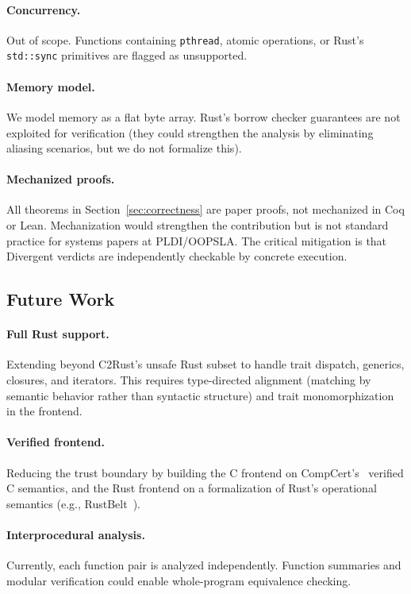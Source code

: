 \documentclass[11pt]{article}
\begin{document}
\paragraph{Concurrency.}
Out of scope. Functions containing \texttt{pthread}, atomic operations, or Rust's \texttt{std::sync} primitives are flagged as unsupported.

\paragraph{Memory model.}
We model memory as a flat byte array. Rust's borrow checker guarantees are not exploited for verification (they could strengthen the analysis by eliminating aliasing scenarios, but we do not formalize this).

\paragraph{Mechanized proofs.}
All theorems in Section~\ref{sec:correctness} are paper proofs, not mechanized in Coq or Lean. Mechanization would strengthen the contribution but is not standard practice for systems papers at PLDI/OOPSLA. The critical mitigation is that Divergent verdicts are independently checkable by concrete execution.

\subsection{Future Work}
\label{sec:future}

\paragraph{Full Rust support.}
Extending beyond C2Rust's unsafe Rust subset to handle trait dispatch, generics, closures, and iterators. This requires type-directed alignment (matching by semantic behavior rather than syntactic structure) and trait monomorphization in the frontend.

\paragraph{Verified frontend.}
Reducing the trust boundary by building the C frontend on CompCert's~\cite{leroy2009} verified C semantics, and the Rust frontend on a formalization of Rust's operational semantics (e.g., RustBelt~\cite{jung2017}).

\paragraph{Interprocedural analysis.}
Currently, each function pair is analyzed independently. Function summaries and modular verification could enable whole-program equivalence checking.
\end{document}
